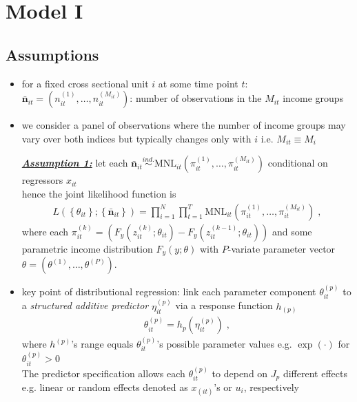 \documentclass[a4paper,12pt]{scrartcl} %
\newcommand{\bs}{\boldsymbol}  %
\begin{document}
\setcounter{page}{1}        %


\section{Model I}
\subsection*{Assumptions}
\begin{itemize}
\item for a fixed cross sectional unit $i$ at some time point $t$:\\ $\bs{\bar{n}}_{it}=\left(n_{it}^{(1)},\ldots,n_{it}^{(M_{it})}\right)$: number of observations in the $M_{it}$ income groups 
\item we consider a panel of observations where the number of income groups may vary over both indices but typically changes only with $i$ i.e. $M_{it}\equiv M_{i}$
\item[\underline{\textbf{\textit{Assumption 1:}}}] let each $\bs{\bar{n}}_{it}\overset{ind.}{\sim} \text{MNL}_{it}\left(\pi_{it}^{(1)},\ldots,\pi_{it}^{(M_{it})}\right)$ conditional on regressors $x_{it}$\\
hence the joint likelihood function is
\begin{align*}
L\left(\left\{\theta_{it}\right\};\left\{\bs{\bar{n}}_{it}\right\}\right)=\prod_{i=1}^N \prod_{t=1}^T \text{MNL}_{it}(\pi_{it}^{(1)},\ldots,\pi_{it}^{(M_{it})})\;,
\end{align*}
where each $\pi_{it}^{(k)}=\left(F_y(z_{it}^{(k)};\theta_{it})-F_y(z_{it}^{(k-1)};\theta_{it})\right)$ and some parametric income distribution $F_y(y;\theta)$ with $P$-variate parameter vector  $\theta=(\theta^{(1)},\ldots,\theta^{(P)})$.
\item key point of distributional regression: link each parameter component $\theta^{(p)}_{it}$ to a \textit{structured additive predictor} $\eta_{it}^{(p)}$ via a response function $h_{(p)}$
\begin{align*}
\theta_{it}^{(p)} = h_{p}(\eta_{it}^{(p)})\;,
\end{align*}
where $h^{(p)}$'s range equals $\theta_{it}^{(p)}$'s possible parameter values e.g. $\exp(\cdot)$ for $\theta_{it}^{(p)}>0$ \\
The predictor specification allows each $\theta_{it}^{(p)}$ to  depend on $J_p$ different effects e.g. linear or random effects denoted as $x_{(it)}$'s or $u_i$,  respectively

\end{itemize}
\end{document}
